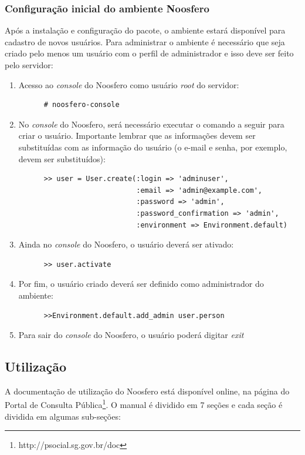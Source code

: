 \documentclass[[a4paper,11pt]{article}
\begin{document}
\subsubsection{Configuração inicial do ambiente Noosfero}

Após a instalação e configuração do pacote, o ambiente estará disponível
para cadastro de novos usuários. Para administrar o ambiente é necessário que seja
criado pelo menos um usuário com o perfil de administrador e isso deve
ser feito pelo servidor:

\begin{enumerate}
  \item Acesso ao {\it console} do Noosfero como usuário {\it root} do
servidor:
    \begin{verbatim}
      # noosfero-console
    \end{verbatim}
  \item No {\it console} do Noosfero, será necessário executar o comando a seguir para
criar o usuário. Importante lembrar que
as informações devem ser substituídas com as informação do usuário
(o e-mail e senha, por exemplo, devem ser substituídos):
    \begin{verbatim}
      >> user = User.create(:login => 'adminuser',
                            :email => 'admin@example.com',
                            :password => 'admin',
                            :password_confirmation => 'admin',
                            :environment => Environment.default)
    \end{verbatim}
  \item Ainda no {\it console} do Noosfero, o usuário deverá ser
ativado:
    \begin{verbatim}
      >> user.activate
    \end{verbatim}
  \item Por fim, o usuário criado deverá ser definido como administrador
do ambiente:
    \begin{verbatim}
      >>Environment.default.add_admin user.person
    \end{verbatim}
  \item Para sair do {\it console} do Noosfero, o usuário poderá digitar
{\it exit}
\end{enumerate}

\subsection{Utilização}

A documentação de utilização do Noosfero está disponível online, na
página do Portal de Consulta
Pública\footnote{http://psocial.sg.gov.br/doc}. O manual é dividido em 7
seções e cada seção é dividida em algumas sub-seções:
\end{document}
